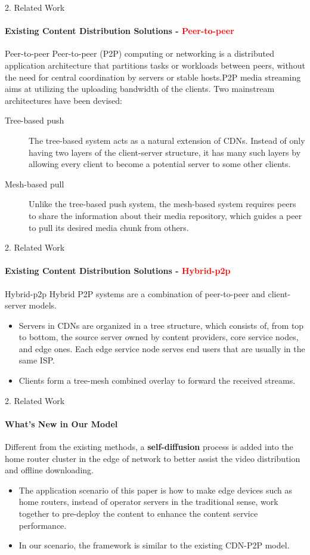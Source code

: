 \documentclass{beamer}		%
\begin{document}
\begin{frame}{2. Related Work}
\framesubtitle{Existing Content Distribution Solutions - \textcolor{red}{Peer-to-peer}}
\begin{block}{Peer-to-peer}
Peer-to-peer (P2P) computing or networking is a distributed application architecture that partitions tasks or workloads between peers, without the need for central coordination by servers or stable hosts.P2P media streaming aims at utilizing the uploading bandwidth of the clients. Two mainstream architectures have been devised: 
\end{block}
\begin{description}
    \item[Tree-based push] The tree-based system acts as a natural extension of CDNs. Instead of only having two layers of the client-server structure, it has many such layers by allowing every client to become a potential server to some other clients.
    \item[Mesh-based pull] Unlike the tree-based push system, the mesh-based system requires peers to share the information about their media repository, which guides a peer to pull its desired media chunk from others.
\end{description}
\end{frame}

\begin{frame}{2. Related Work}
\framesubtitle{Existing Content Distribution Solutions - \textcolor{red}{Hybrid-p2p}}
\begin{block}{Hybrid-p2p}
Hybrid P2P systems are a combination of peer-to-peer and client-server models. 
\end{block}
\begin{itemize}
\item Servers in CDNs are organized in a tree structure, which consists of, from top to bottom, the source server owned by content providers, core service nodes, and edge ones. Each edge service node serves end users that are usually in the same ISP.
\item  Clients form a tree-mesh combined overlay to forward the received streams.
\end{itemize}
\end{frame}

\begin{frame}{2. Related Work}
\framesubtitle{What's New in Our Model}
Different from the existing methods, a \textbf{self-diffusion} process is added into the home router cluster in the edge of network to better assist the video distribution and offline downloading.
\begin{itemize}
    \item The application scenario of this paper is how to make edge devices such as home routers, instead of operator servers in the traditional sense, work together to pre-deploy the content to enhance the content service performance.
    \item In our scenario, the framework is similar to the existing CDN-P2P model.
\end{itemize}
\end{frame}
\end{document}
